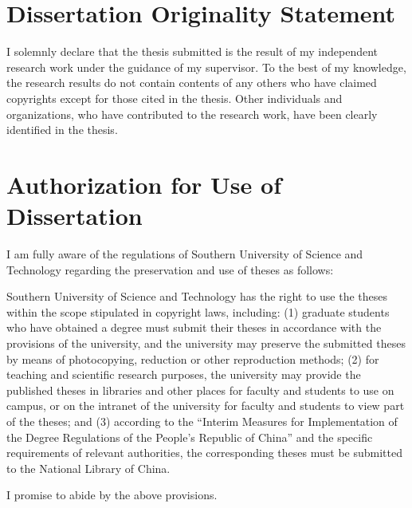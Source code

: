 \begin{statementcopyright}
  \section*{Dissertation Originality Statement}
  \vspace{1em}

    I solemnly declare that the thesis submitted is the result of my independent research work under the guidance of my supervisor. To the best of my knowledge, the research results do not contain contents of any others who have claimed copyrights except for those cited in the thesis. Other individuals and organizations, who have contributed to the research work, have been clearly identified in the thesis.

  \authorsign

  \section*{Authorization for Use of Dissertation}

  \vspace{1em}

    I am fully aware of the regulations of Southern University of Science and Technology regarding the preservation and use of theses as follows:

    Southern University of Science and Technology has the right to use the theses within the scope stipulated in copyright laws, including: (1) graduate students who have obtained a degree must submit their theses in accordance with the provisions of the university, and the university may preserve the submitted theses by means of photocopying, reduction or other reproduction methods; (2) for teaching and scientific research purposes, the university may provide the published theses in libraries and other places for faculty and students to use on campus, or on the intranet of the university for faculty and students to view part of the theses; and (3) according to the “Interim Measures for Implementation of the Degree Regulations of the People’s Republic of China” and the specific requirements of relevant authorities, the corresponding theses must be submitted to the National Library of China.

    I promise to abide by the above provisions.
    

  \authorsupervisorsign

\end{statementcopyright}